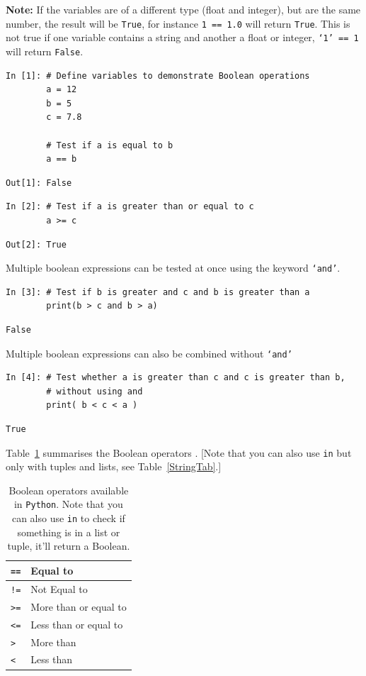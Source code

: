 \textbf{Note:} If the variables are of a different type (float and integer), but are the same number, the result will be \texttt{True}, for instance \texttt{1 == 1.0} will return \texttt{True}. This is not true if one variable contains a string and another a float or integer, \texttt{`1' == 1} will return \texttt{False}.

\begin{lstlisting}[style=PY] 
In [1]: # Define variables to demonstrate Boolean operations
        a = 12
        b = 5
        c = 7.8
        
        # Test if a is equal to b
        a == b
\end{lstlisting}
\begin{lstlisting}[style=PY_out]
Out[1]: False
\end{lstlisting}
\begin{lstlisting}[style=PY]
In [2]: # Test if a is greater than or equal to c
        a >= c
\end{lstlisting}
\begin{lstlisting}[style=PY_out]
Out[2]: True
\end{lstlisting}
Multiple boolean expressions can be tested at once using the keyword \texttt{`and'}.
\begin{lstlisting}[style=PY]
In [3]: # Test if b is greater and c and b is greater than a
        print(b > c and b > a)
\end{lstlisting}
\begin{lstlisting}[style=PY_out]
        False
\end{lstlisting}
Multiple boolean expressions can also be combined without \texttt{`and'}
\begin{lstlisting}[style=PY]
In [4]: # Test whether a is greater than c and c is greater than b,
        # without using and
        print( b < c < a )
\end{lstlisting}
\begin{lstlisting}[style=PY_out]
        True
\end{lstlisting}

Table~\ref{BooTab} summarises the Boolean operators . [Note that you can also use {\tt in} but only with tuples and lists, see Table~\ref{StringTab}.]

\begin{table}[!h]
\begin{center}
\begin{tabular}{|l | p{4cm}|}
\hline
\texttt{==} & Equal to\\\hline
\texttt{!=} & Not Equal to\\\hline
\texttt{>=} & More than or equal to\\\hline
\texttt{<=} & Less than or equal to\\\hline
\texttt{>} & More than\\\hline
\texttt{<} & Less than\\\hline
\end{tabular}
\end{center}
\caption{Boolean operators available in \texttt{Python}. Note that you can also use \texttt{in} to check if something is in a list or tuple, it'll return a Boolean.}
\label{BooTab}
\end{table}

